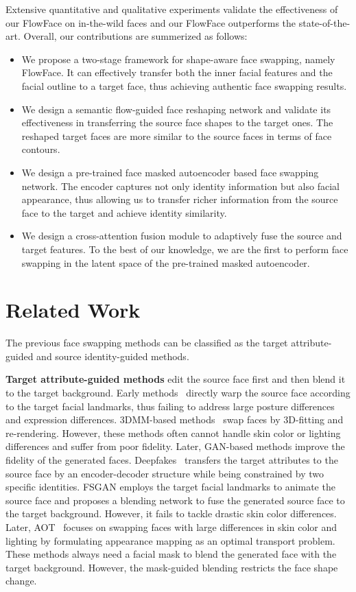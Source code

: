 Extensive quantitative and qualitative experiments validate the effectiveness of our FlowFace on in-the-wild faces and our FlowFace outperforms the state-of-the-art.
Overall, our contributions are summerized as follows:
\begin{itemize}
    \item We propose a two-stage framework for shape-aware face swapping, namely FlowFace. It can effectively transfer both the inner facial features and the facial outline to a target face, thus achieving authentic face swapping results.
    \item We design a semantic flow-guided face reshaping network and validate its effectiveness in transferring the source face shapes to the target ones. The reshaped target faces are more similar to the source faces in terms of face contours.
    \item We design a pre-trained face masked autoencoder based face swapping network. The encoder captures not only identity information but also facial appearance, thus allowing us to transfer richer information from the source face to the target and achieve identity similarity.
    \item We design a cross-attention fusion module to adaptively fuse the source and target features. To the best of our knowledge, we are the first to perform face swapping in the latent space of the pre-trained masked autoencoder.
\end{itemize}
\section{Related Work}
 
The previous face swapping methods can be classified as the target attribute-guided and source identity-guided methods.

\textbf{Target attribute-guided methods} edit the source face first and then blend it to the target background. 
Early methods~\cite{bitouk2008face,chen2019face,lin2012face} directly warp the source face according to the target facial landmarks, thus failing to address large posture differences and expression differences. 
3DMM-based methods~\cite{blanz2004exchanging,thies2016face2face,faceswap,nirkin2018face} swap faces by 3D-fitting and re-rendering. However, these methods often cannot handle skin color or lighting differences and suffer from poor fidelity. Later, GAN-based methods improve the fidelity of the generated faces. Deepfakes~\cite{deepfakes} transfers the target attributes to the source face by an encoder-decoder structure while being constrained by two specific identities.
FSGAN\cite{nirkin2019fsgan} employs the target facial landmarks to animate the source face and proposes a blending network to fuse the generated source face to the target background. However, it fails to tackle drastic skin color differences. 
Later, AOT~\cite{aot2020neurips} focuses on swapping faces with large differences in skin color and lighting by formulating appearance mapping as an optimal transport problem.
These methods always need a facial mask to blend the generated face with the target background. However, the mask-guided blending restricts the face shape change.

